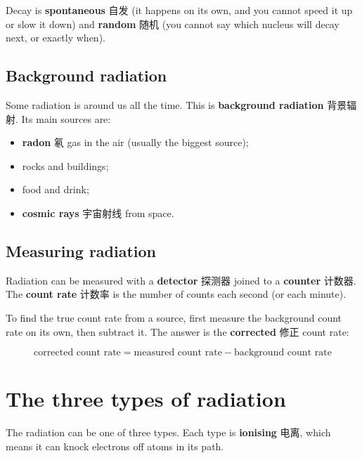 \documentclass[11pt]{article}
\begin{document}
Decay is \textbf{spontaneous} 自发 (it happens on its own, and you cannot speed it up or slow it down) and \textbf{random} 随机 (you cannot say which nucleus will decay next, or exactly when).

\subsection*{Background radiation}

Some radiation is around us all the time. This is \textbf{background radiation} 背景辐射. Its main sources are:

\begin{itemize}
\item \textbf{radon} 氡 gas in the air (usually the biggest source);

\item rocks and buildings;

\item food and drink;

\item \textbf{cosmic rays} 宇宙射线 from space.

\end{itemize}

\subsection*{Measuring radiation}

Radiation can be measured with a \textbf{detector} 探测器 joined to a \textbf{counter} 计数器. The \textbf{count rate} 计数率 is the number of counts each second (or each minute).

To find the true count rate from a source, first measure the background count rate on its own, then subtract it. The answer is the \textbf{corrected} 修正 count rate:

\[
\text{corrected count rate} = \text{measured count rate} - \text{background count rate}
\]

\section*{The three types of radiation}

The radiation can be one of three types. Each type is \textbf{ionising} 电离, which means it can knock electrons off atoms in its path.
\end{document}
